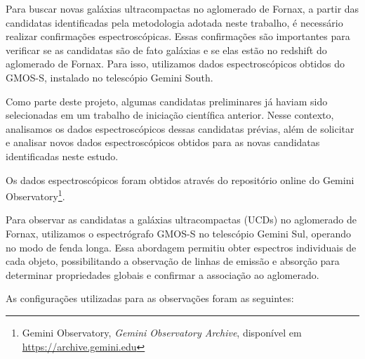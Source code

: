 Para buscar novas galáxias ultracompactas no aglomerado de Fornax, a partir das candidatas identificadas pela metodologia adotada neste trabalho, é necessário realizar confirmações espectroscópicas. Essas confirmações são importantes para verificar se as candidatas são de fato galáxias e se elas estão no redshift do aglomerado de Fornax. Para isso, utilizamos dados espectroscópicos obtidos do GMOS-S, instalado no telescópio Gemini South.

Como parte deste projeto, algumas candidatas preliminares já haviam sido selecionadas em um trabalho de iniciação científica anterior. Nesse contexto, analisamos os dados espectroscópicos dessas candidatas prévias, além de solicitar e analisar novos dados espectroscópicos obtidos para as novas candidatas identificadas neste estudo.

Os dados espectroscópicos foram obtidos através do repositório online do Gemini Observatory\footnote{Gemini Observatory, \textit{Gemini Observatory Archive}, disponível em \url{https://archive.gemini.edu}}.


Para observar as candidatas a galáxias ultracompactas (UCDs) no aglomerado de Fornax, utilizamos o espectrógrafo GMOS-S no telescópio Gemini Sul, operando no modo de fenda longa. Essa abordagem permitiu obter espectros individuais de cada objeto, possibilitando a observação de linhas de emissão e absorção para determinar propriedades globais e confirmar a associação ao aglomerado.

As configurações utilizadas para as observações foram as seguintes:

